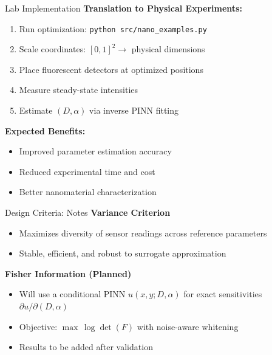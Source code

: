 \documentclass[aspectratio=169]{beamer}
\begin{document}
\begin{frame}{Lab Implementation}
\textbf{Translation to Physical Experiments:}
\begin{enumerate}
    \item Run optimization: \texttt{python src/nano\_examples.py}
    \item Scale coordinates: $[0,1]^2 \rightarrow$ physical dimensions
    \item Place fluorescent detectors at optimized positions
    \item Measure steady-state intensities
    \item Estimate $(D, \alpha)$ via inverse PINN fitting
\end{enumerate}

\vspace{0.3cm}
\textbf{Expected Benefits:}
\begin{itemize}
    \item Improved parameter estimation accuracy
    \item Reduced experimental time and cost
    \item Better nanomaterial characterization
\end{itemize}
\end{frame}

\begin{frame}{Design Criteria: Notes}
\textbf{Variance Criterion}
\begin{itemize}
    \item Maximizes diversity of sensor readings across reference parameters
    \item Stable, efficient, and robust to surrogate approximation
\end{itemize}

\vspace{0.3cm}
\textbf{Fisher Information (Planned)}
\begin{itemize}
    \item Will use a conditional PINN $u(x,y;D,\alpha)$ for exact sensitivities $\partial u/\partial (D,\alpha)$
    \item Objective: $\max\, \log\det(F)$ with noise-aware whitening
    \item Results to be added after validation
\end{itemize}
\end{frame}
\end{document}
